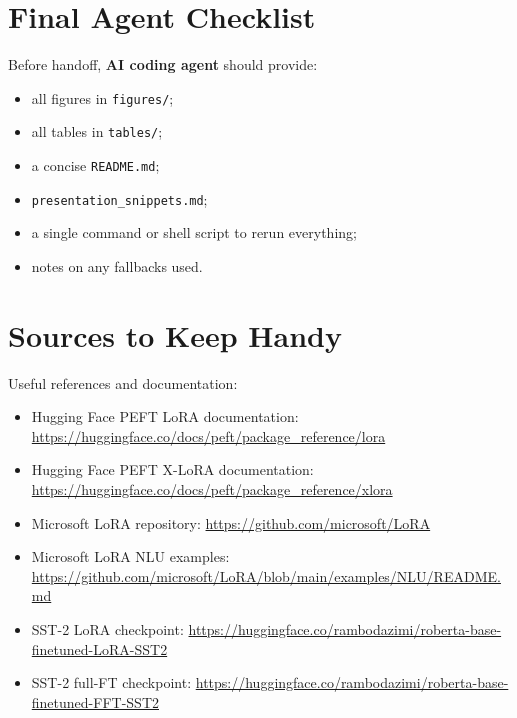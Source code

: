 \documentclass[11pt]{article}
\newcommand{\agent}{\textbf{AI coding agent}}
\begin{document}
\section{Final Agent Checklist}

Before handoff, \agent{} should provide:

\begin{itemize}[leftmargin=*]
    \item all figures in \texttt{figures/};
    \item all tables in \texttt{tables/};
    \item a concise \texttt{README.md};
    \item \texttt{presentation\_snippets.md};
    \item a single command or shell script to rerun everything;
    \item notes on any fallbacks used.
\end{itemize}

\section{Sources to Keep Handy}

Useful references and documentation:

\begin{itemize}[leftmargin=*]
    \item Hugging Face PEFT LoRA documentation: \url{https://huggingface.co/docs/peft/package_reference/lora}
    \item Hugging Face PEFT X-LoRA documentation: \url{https://huggingface.co/docs/peft/package_reference/xlora}
    \item Microsoft LoRA repository: \url{https://github.com/microsoft/LoRA}
    \item Microsoft LoRA NLU examples: \url{https://github.com/microsoft/LoRA/blob/main/examples/NLU/README.md}
    \item SST-2 LoRA checkpoint: \url{https://huggingface.co/rambodazimi/roberta-base-finetuned-LoRA-SST2}
    \item SST-2 full-FT checkpoint: \url{https://huggingface.co/rambodazimi/roberta-base-finetuned-FFT-SST2}
\end{itemize}
\end{document}
